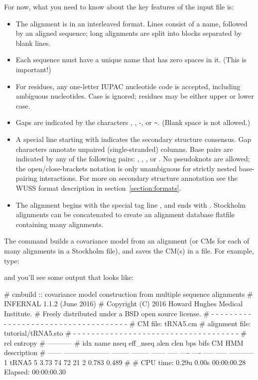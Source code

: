 For now, what you need to know about the key features of the input file is:
\begin{itemize}
\item The alignment is in an interleaved format.
Lines consist of a name, followed by an aligned sequence;
long alignments are split into blocks separated by blank lines.
\item Each sequence must have a unique name that has zero spaces in it. (This is important!)
\item For residues, any one-letter IUPAC nucleotide code is accepted,
      including ambiguous nucleotides. Case is ignored; residues
      may be either upper or lower case.
\item Gaps are indicated by the characters , \otext{\_}, -, or \verb+~+.
      (Blank space is not allowed.)
\item A special line starting with  indicates
      the secondary structure consensus. Gap characters annotate
      unpaired (single-stranded) columns. Base pairs are indicated
      by any of the following pairs: \otext{<>}, \otext{()}, \otext{[]},
      or \otext{\{\}}. No pseudoknots are allowed; the
      open/close-brackets notation is only unambiguous for strictly
      nested base-pairing interactions.
      For more on secondary structure annotation see the WUSS format
      description in section~\ref{section:formats}.
\item The alignment begins with the special tag line
      , and ends with \otext{//}.
      Stockholm alignments
      can be concatenated to create an alignment database flatfile
      containing many alignments.
\end{itemize}

The  command builds a covariance model from an alignment (or
CMs for each of many alignments in a Stockholm file), and saves the
CM(s) in a file. For example, type:


and you'll see some output that looks like:

\begin{sreoutput}
# cmbuild :: covariance model construction from multiple sequence alignments
# INFERNAL 1.1.2 (June 2016)
# Copyright (C) 2016 Howard Hughes Medical Institute.
# Freely distributed under a BSD open source license.
# - - - - - - - - - - - - - - - - - - - - - - - - - - - - - - - - - - - -
# CM file:                                            tRNA5.cm
# alignment file:                                     tutorial/tRNA5.sto
# - - - - - - - - - - - - - - - - - - - - - - - - - - - - - - - - - - - -
#                                                                      rel entropy
#                                                                      -----------
# idx    name                     nseq eff_nseq   alen  clen  bps bifs    CM   HMM description
# ------ -------------------- -------- -------- ------ ----- ---- ---- ----- ----- -----------
       1 tRNA5                       5     3.73     74    72   21    2 0.783 0.489 
#
# CPU time: 0.29u 0.00s 00:00:00.28 Elapsed: 00:00:00.30
\end{sreoutput}

